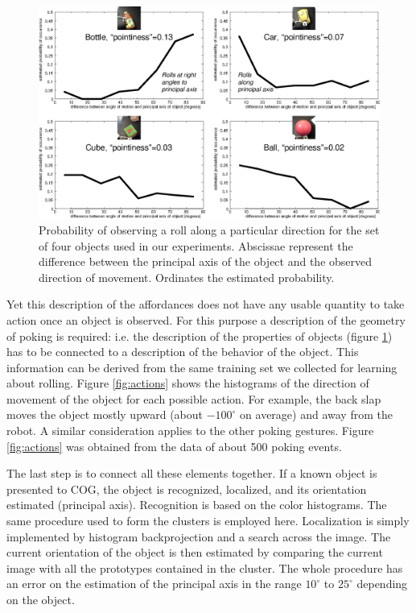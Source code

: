 \begin{figure}[tbh]
\begin{center}
\includegraphics[width=\columnwidth]{affordances.eps}
\caption{ 
\label{fig:affordances}
%
Probability of observing a roll along a particular direction for the set
of four objects used in our experiments. Abscissae represent the difference
between the principal axis of the object and the observed direction of 
movement. Ordinates the estimated probability.
%
}
\end{center}
\end{figure}

Yet this description of the affordances does not have any usable quantity to 
take action once an object is observed. For this purpose a description of 
the geometry of poking is required: i.e. the description of the properties of 
objects (figure \ref{fig:affordances}) has to be connected to a description
of the behavior of the object. 
This information can be derived from the same training set we collected for learning
about rolling. Figure \ref{fig:actions} shows the histograms of the direction 
of movement of the object for
each possible action. For example, the back slap moves the object mostly upward
(about $-100^\circ$ on average) and away from the robot. A similar consideration applies
to the other poking gestures. Figure \ref{fig:actions} was obtained from the data of
about 500 poking events.

The last step is to connect all these elements together. If a known object is
presented to COG, the object is recognized, localized, and
its orientation estimated (principal axis). Recognition is based on the color histograms. The same
procedure used to form the clusters is employed here. Localization is simply implemented 
by histogram backprojection and a search across the image. The current orientation of the
object is then estimated by comparing the current image with all the prototypes 
contained in the cluster. The whole procedure has an error on the estimation
of the principal axis in the range $10^\circ$ to $25^\circ$ depending on the object.  


